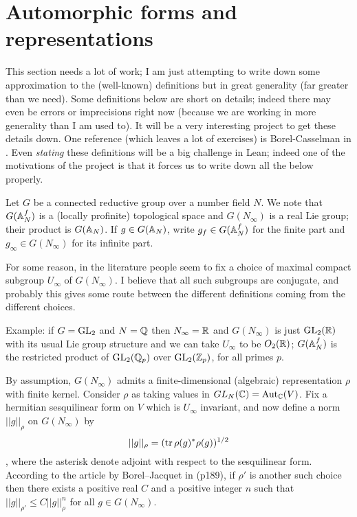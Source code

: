 \section{Automorphic forms and representations}

This section needs a lot of work; I am just attempting to write down some approximation to the (well-known) definitions but in great generality (far greater than we need). Some definitions below are short on details; indeed there may even be errors or imprecisions right now (because we are working in more generality than I am used to). It will be a very interesting project to get these details down. One reference (which leaves a lot of exercises) is Borel-Casselman in \cite{corvallis1}. Even \emph{stating} these definitions will be a big challenge in Lean; indeed one of the motivations of the project is that it forces us to write down all the below properly.

Let $G$ be a connected reductive group over a number field $N$.  We note
that $G(\mathbb{A}_N^f)$ is a (locally profinite) topological space and $G(N_\infty)$ is a real Lie group;
their product is $G(\mathbb{A}_N)$. If $g\in G(\mathbb{A}_N)$, write $g_f\in G(\mathbb{A}_N^f)$ for the finite part and $g_\infty\in G(N_\infty)$ for its infinite part.

For some reason, in the literature people seem to fix a choice of maximal compact subgroup $U_\infty$ of $G(N_\infty)$. I believe that all such subgroups are conjugate, and probably this gives some route between the different definitions coming from the different choices.

Example: if $G=\operatorname{GL}_2$ and $N=\mathbb{Q}$ then $N_\infty=\mathbb{R}$ and $G(N_\infty)$ is just $\operatorname{GL}_2(\mathbb{R})$ with its usual Lie group structure and we can take $U_\infty$ to be $O_2(\mathbb{R})$; $G(\mathbb{A}_N^f)$ is the restricted product of $\operatorname{GL}_2(\mathbb{Q}_p)$ over $\operatorname{GL}_2(\mathbb{Z}_p)$, for all primes $p$.

By assumption, $G(N_\infty)$ admits a finite-dimensional (algebraic) representation $\rho$ with finite kernel. Consider $\rho$ as taking values in $GL_N({\mathbb{C}})=\operatorname{Aut}_{\mathbb{C}}(V)$. Fix a hermitian sesquilinear form on $V$ which 
is $U_\infty$ invariant, and now define a norm $||g||_\rho$ on $G(N_\infty)$ by $$||g||_\rho=(\operatorname{tr} \rho(g)^*\rho(g))^{1/2}$$, where the asterisk denote adjoint with respect to the sesquilinear form. According to the article by Borel--Jacquet in \cite{corvallis1} (p189), if $\rho'$ is another such choice then there exists a positive real $C$ and a positive integer $n$ such that $||g||_{\rho'}\leq C||g||_\rho^n$ for all $g\in G(N_\infty)$.

